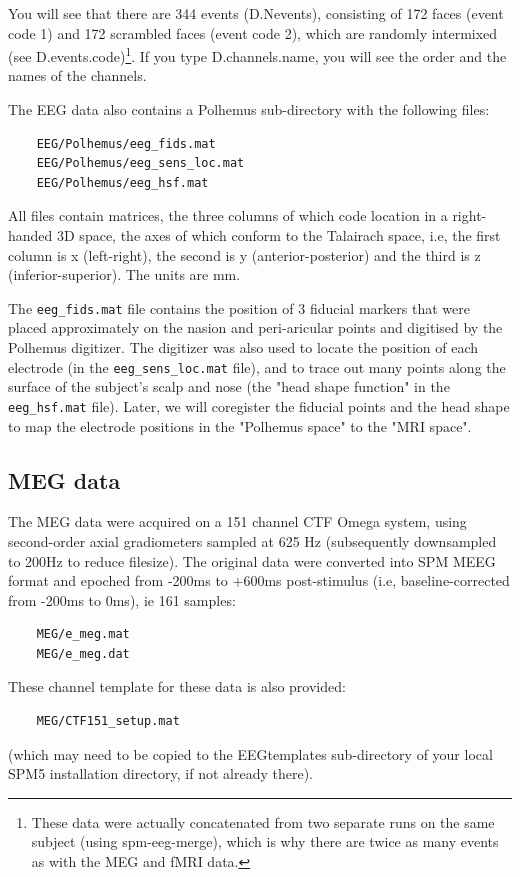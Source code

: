 You will see that there are 344 events (D.Nevents), consisting of 172 faces (event code 1) and 172 scrambled faces (event code 2), which are randomly intermixed (see D.events.code)\footnote{These data were actually concatenated from two separate runs on the same subject (using spm-eeg-merge), which is why there are twice as many events as with the MEG and fMRI data.}. If you type D.channels.name, you will see the order and the names of the channels.

The EEG data also contains a Polhemus sub-directory with the following files:
\begin{verbatim}
	EEG/Polhemus/eeg_fids.mat
	EEG/Polhemus/eeg_sens_loc.mat
	EEG/Polhemus/eeg_hsf.mat
\end{verbatim}
All files contain matrices, the three columns of which code location in a right-handed 3D space, the axes of which conform to the Talairach space, i.e, the first column is x (left-right), the second is y (anterior-posterior) and the third is z (inferior-superior). The units are mm.

The \verb!eeg_fids.mat! file contains the position of 3 fiducial markers that were placed approximately on the nasion and peri-aricular points and digitised by the Polhemus digitizer. The digitizer was also used to locate the position of each electrode (in the \verb!eeg_sens_loc.mat! file), and to trace out many points along the surface of the subject's scalp and nose (the "head shape function" in the \verb!eeg_hsf.mat! file). Later, we will coregister the fiducial points and the head shape to map the electrode positions in the "Polhemus space" to the "MRI space".

\subsection{MEG data \label{meg}}

The MEG data were acquired on a 151 channel CTF Omega system, using second-order axial gradiometers sampled at 625 Hz (subsequently downsampled to 200Hz to reduce filesize).  The original data were converted into SPM MEEG format and epoched from -200ms to +600ms post-stimulus (i.e, baseline-corrected from -200ms to 0ms), ie 161 samples:
\begin{verbatim}
	MEG/e_meg.mat
	MEG/e_meg.dat
\end{verbatim}
These channel template for these data is also provided:
\begin{verbatim}
	MEG/CTF151_setup.mat
\end{verbatim}
(which may need to be copied to the EEGtemplates sub-directory of your local SPM5 installation directory, if not already there).

